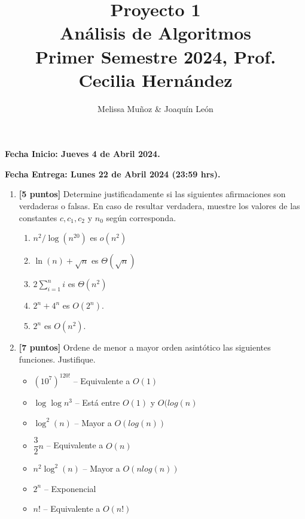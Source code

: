 \documentclass[10pt]{article}
\title{Proyecto 1\\ {\Large Análisis de Algoritmos}\\ {\Large Primer Semestre 2024,} {\large Prof. Cecilia Hernández}}
\date{}
\author{Melissa Muñoz \& Joaquín León}
\begin{document}
\maketitle

 {\bf  Fecha Inicio: Jueves 4 de Abril 2024. }
 
 {\bf Fecha Entrega: Lunes 22 de Abril 2024 (23:59 hrs). }
%


\begin{enumerate}
 \item \textbf{[5 puntos]}
Determine justificadamente si las siguientes afirmaciones son verdaderas o falsas. En caso de resultar verdadera, muestre los valores de las constantes $c,c_1,c_2$ y $n_0$ según corresponda.
\begin{enumerate}
  \item $n^2/\log(n^{20})$ es $o(n^2)$
  \item $\ln(n)+\sqrt{n}$ es $\Theta(\sqrt{n})$
  \item $2\sum_{i=1}^n i$ es $\Theta(n^2)$
  \item $2^n+4^n$ es $O(2^n)$.
  \item $2^n$ es $O(n^2)$.
\end{enumerate}


\item \textbf{[7 puntos]}  Ordene de menor a mayor orden asintótico las siguientes funciones. Justifique.

\begin{itemize}
  \item $(10^7)^{120!}$ \--- Equivalente a $O(1)$

  \item $\log \log n^3$ \--- Está entre $O(1)$ y $O(log(n)$
  \item $\log^2(n)	$   \--- Mayor a $O(log(n))$
  \item $\dfrac{3}{2}n$ \--- Equivalente a $O(n)$
  \item $n^2\log^2(n)$  \--- Mayor a $O(nlog(n))$
  \item $2^n$ 					\--- Exponencial
  \item $n!$            \--- Equivalente a $O(n!)$
\end{itemize}


\end{enumerate}
\end{document}
